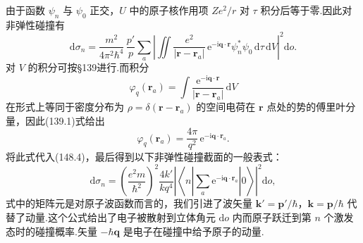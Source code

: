 由于函数 $\psi_n$ 与 $\psi_0$ 正交，$U$ 中的原子核作用项 $Ze^2/r$ 对 $\tau$ 积分后等于零.因此对非弹性碰撞有
\begin{equation}
  \mathrm{d}\sigma_n=\frac{m^2}{4\pi^2\hbar^4}\,\frac{p'}{p}\sum_a
  \left|\iint\frac{e^2}{|\boldsymbol{r}-\boldsymbol{r}_a|}\,
  \mathrm{e}^{-\mathrm{i}\boldsymbol{q}\cdot\boldsymbol{r}}\psi_n^{*}\psi_0\,\mathrm{d}\tau\,\mathrm{d}V\right|^2\mathrm{d}o.
\end{equation}
对 $V$ 的积分可按§139进行.而积分
\begin{equation*}
  \varphi_q(\boldsymbol{r}_a)=\int\frac{\mathrm{e}^{-\mathrm{i}\boldsymbol{q}\cdot\boldsymbol{r}}}
  {|\boldsymbol{r}-\boldsymbol{r}_a|}\,\mathrm{d}V
\end{equation*}
在形式上等同于密度分布为 $\rho=\delta(\boldsymbol{r}-\boldsymbol{r}_a)$ 的空间电荷在 $\boldsymbol{r}$ 点处的势的傅里叶分量，因此(139.1)式给出
\begin{equation}
  \varphi_q(\boldsymbol{r}_a)=\frac{4\pi}{q^2}\,\mathrm{e}^{-\mathrm{i}\boldsymbol{q}\cdot\boldsymbol{r}_a}.
\end{equation}
将此式代入(148.4)，最后得到以下非弹性碰撞截面的一般表式：
\begin{equation}
  \mathrm{d}\sigma_n=\left(\frac{e^2m}{\hbar^2}\right)^2\frac{4k'}{kq^4}
  \left|\left\langle n\left|\sum_a\mathrm{e}^{-\mathrm{i}\boldsymbol{q}\cdot\boldsymbol{r}_a}\right|0\right\rangle\right|^2\mathrm{d}o,
\end{equation}
式中的矩阵元是对原子波函数而言的，我们引进了波矢量 $\boldsymbol{k}'=\boldsymbol{p}'/\hbar$，$\boldsymbol{k}=\boldsymbol{p}/\hbar$ 代替了动量.这个公式给出了电子被散射到立体角元 $\mathrm{d}o$ 内而原子跃迁到第 $n$ 个激发态时的碰撞概率.矢量 $-\hbar\boldsymbol{q}$ 是电子在碰撞中给予原子的动量.

